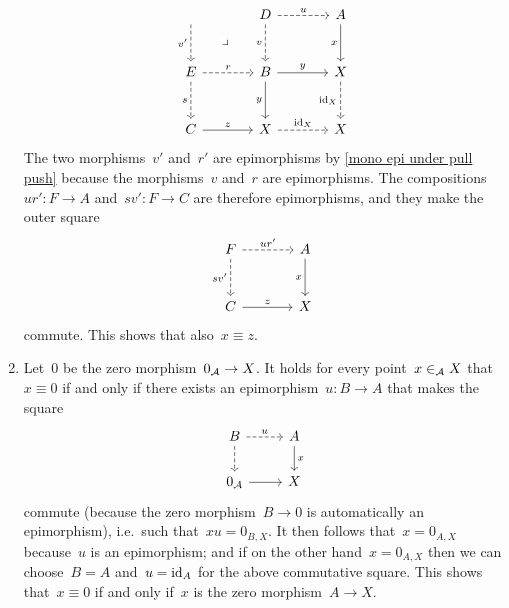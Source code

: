 \begin{remarkdefinition}[continues=abstract points]
\begin{enumerate}[start=3]
\[\begin{tikzcd}[sep = large]
            \arrow[dashed]{d}[left]{v'}
            \arrow[phantom]{dr}[description]{\pb}
          & D
            \arrow[dashed]{r}[above]{u}
            \arrow[dashed]{d}[left]{v}
          & A
            \arrow{d}[left]{x}
          \\
            E
            \arrow[dashed]{r}[above]{r}
            \arrow[dashed]{d}[left]{s}
          & B
            \arrow{r}[above]{y}
            \arrow{d}[left]{y}
          & X
            \arrow[dashed]{d}[left]{\id_X}
          \\
            C
            \arrow{r}[above]{z}
          & X
            \arrow[dashed]{r}[above]{\id_X}
          & X
        \end{tikzcd}
      \]
      The two morphisms~$v'$ and~$r'$ are epimorphisms by \cref{mono epi under pull push} because the morphisms~$v$ and~$r$ are epimorphisms.
      The compositions~$u r' \colon F \to A$ and~$s v' \colon F \to C$ are therefore epimorphisms, and they make the outer square
      \[
        \begin{tikzcd}[sep = large]
            F
            \arrow[dashed]{r}[above]{u r'}
            \arrow[dashed]{d}[left]{s v'}
          & A
            \arrow{d}[left]{x}
          \\
            C
            \arrow{r}[above]{z}
          & X
        \end{tikzcd}
      \]
      commute.
      This shows that also~$x \equiv z$.
    \item
      Let~$0$ be the zero morphism~$0_{\mathcal{A}} \to X$.
      It holds for every point~$x \in_{\mathcal{A}} X$ that~$x \equiv 0$ if and only if there exists an epimorphism~$u \colon B \to A$ that makes the square
      \[
        \begin{tikzcd}
            B
            \arrow[dashed]{r}[above]{u}
            \arrow[dashed]{d}
          & A
            \arrow{d}[right]{x}
          \\
            0_\Acat
            \arrow{r}
          & X
        \end{tikzcd}
      \]
      commute (because the zero morphism~$B \to 0$ is automatically an epimorphism), i.e.\ such that~$xu = 0_{B,X}$.
      It then follows that~$x = 0_{A,X}$ because~$u$ is an epimorphism;
      and if on the other hand~$x = 0_{A,X}$ then we can choose~$B = A$ and~$u = \operatorname{id}_A$ for the above commutative square.
      This shows that~$x \equiv 0$ if and only if~$x$ is the zero morphism~$A \to X$.
      

\end{enumerate}
\end{remarkdefinition}
